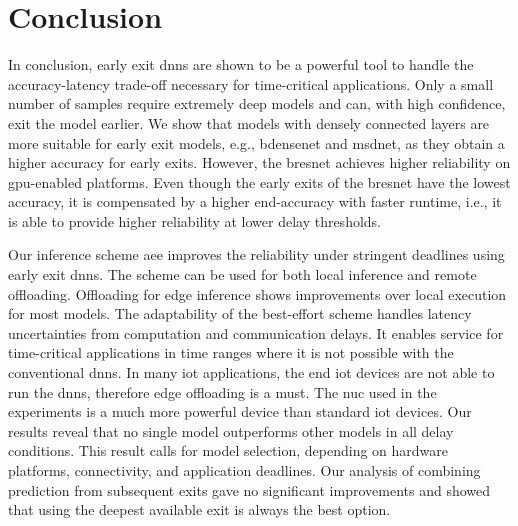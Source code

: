 \hypertarget{conclusion}{%
\chapter{Conclusion}\label{ch:conclusion}}


In conclusion, early exit \gls{dnn}s are shown to be a powerful tool to handle the accuracy-latency trade-off necessary for time-critical applications. Only a small number of samples require extremely deep models and can, with high confidence, exit the model earlier. We show that models with densely connected layers are more suitable for early exit models, e.g., \gls{bdensenet} and \gls{msdnet}, as they obtain a higher accuracy for early exits. However, the \gls{bresnet} achieves higher reliability on \gls{gpu}-enabled platforms. Even though the early exits of the \gls{bresnet} have the lowest accuracy, it is compensated by a higher end-accuracy with faster runtime, i.e., it is able to provide higher reliability at lower delay thresholds.

Our inference scheme \gls{aee} improves the reliability under stringent deadlines using early exit \gls{dnn}s. The scheme can be used for both local inference and remote offloading. Offloading for edge inference shows improvements over local execution for most models. The adaptability of the best-effort scheme handles latency uncertainties from computation and communication delays. It enables service for time-critical applications in time ranges where it is not possible with the conventional \gls{dnn}s. In many \gls{iot} applications, the end \gls{iot} devices are not able to run the \gls{dnn}s, therefore edge offloading is a must. The \gls{nuc} used in the experiments is a much more powerful device than standard \gls{iot} devices. Our results reveal that no single model outperforms other models in all delay conditions. This result calls for model selection, depending on hardware platforms, connectivity, and application deadlines. Our analysis of combining prediction from subsequent exits gave no significant improvements and showed that using the deepest available exit is always the best option.


